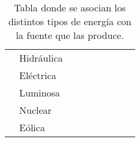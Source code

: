 \begin{table}[H]
\begin{tabular}{cl*{7}{c|}}
                                                               & \cellcolor{corn}  Hidráulica &                                                                        &                                                       &                                            &                                       &                                                      &                                           &                                                       \\ \cline{2-9}
                                                               & \cellcolor{corn}  Eléctrica  &                                                                        &                                                       &                                            &                                       &                                                      &                                           &                                                       \\ \cline{2-9}
                                                               & \cellcolor{corn}  Luminosa   &                                                                        &                                                       &                                            &                                       &                                                      &                                           &                                                       \\ \cline{2-9}
                                                               & \cellcolor{corn}  Nuclear    &                                                                        &                                                       &                                            &                                       &                                                      &                                           &                                                       \\ \cline{2-9}
                                                               & \cellcolor{corn}  Eólica     &                                                                        &                                                       &                                            &                                       &                                                      &                                           &                                                       \\ \cline{2-9}
        \end{tabular}
        \caption{Tabla donde se asocian los distintos tipos de energía con la fuente que las produce.}
        \label{tab:tiposenergia}
    \end{table}
\fi
